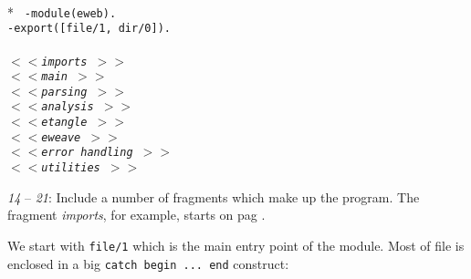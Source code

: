 \begin{flushleft}
\label{eweb.erl_start}
\\*
\tt
\noindent{}%
\verb&-module(eweb).&\\
\noindent{}%
\verb&-export([file/1, dir/0]).&\\
\noindent{}%
\verb&&\\
\noindent{}%
\verb&&{\sl $<<$imports \pageref{imports_start} $>>$}\\
\noindent{}%
\verb&&{\sl $<<$main \pageref{main_start} $>>$}\\
\noindent{}%
\verb&&{\sl $<<$parsing \pageref{parsing_start} $>>$}\\
\noindent{}%
\verb&&{\sl $<<$analysis \pageref{analysis_start} $>>$}\\
\noindent{}%
\verb&&{\sl $<<$etangle \pageref{etangle_start} $>>$}\\
\noindent{}%
\verb&&{\sl $<<$eweave \pageref{eweave_start} $>>$}\\
\noindent{}%
\verb&&{\sl $<<$error handling \pageref{error handling_start} $>>$}\\
\noindent{}%
\verb&&{\sl $<<$utilities \pageref{utilities_start} $>>$}\\
\end{flushleft}

{\sl 14} -- {\sl 21}: Include a number of fragments which make up the
program. The fragment {\sl imports}, for example, starts on pag
\pageref{imports_start}.

    We start with \verb+file/1+ which  is the main  entry point of the
module.  Most of file is enclosed in a big  \verb+catch begin ... end+
construct:

